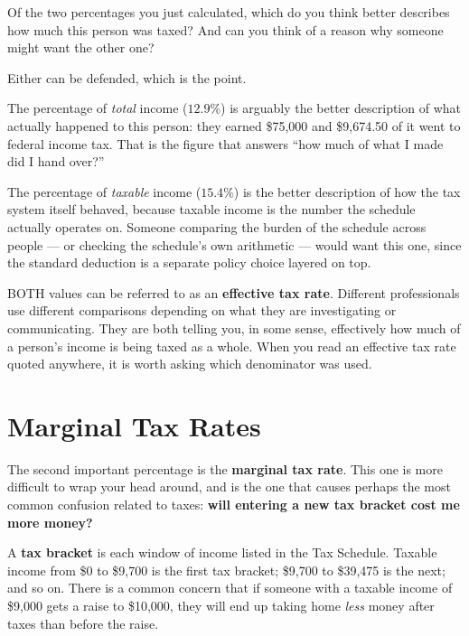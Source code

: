\documentclass[12pt]{ximera}
\begin{document}
\begin{problem}
Of the two percentages you just calculated, which do you think better describes how much
this person was taxed? And can you think of a reason why someone might want the other
one?

\begin{freeResponse}
\end{freeResponse}

\begin{solution}
Either can be defended, which is the point.

The percentage of \emph{total} income ($12.9\%$) is arguably the better description of
what actually happened to this person: they earned \$75,000 and \$9,674.50 of it went to
federal income tax. That is the figure that answers ``how much of what I made did I hand
over?''

The percentage of \emph{taxable} income ($15.4\%$) is the better description of how the
tax system itself behaved, because taxable income is the number the schedule actually
operates on. Someone comparing the burden of the schedule across people --- or checking
the schedule's own arithmetic --- would want this one, since the standard deduction is a
separate policy choice layered on top.

BOTH values can be referred to as an \textbf{effective tax rate}. Different
professionals use different comparisons depending on what they are investigating or
communicating. They are both telling you, in some sense, effectively how much of a
person's income is being taxed as a whole. When you read an effective tax rate quoted
anywhere, it is worth asking which denominator was used.
\end{solution}
\end{problem}

\section*{Marginal Tax Rates}

The second important percentage is the \textbf{marginal tax rate}. This one is more
difficult to wrap your head around, and is the one that causes perhaps the most common
confusion related to taxes: \textbf{will entering a new tax bracket cost me more money?}

A \textbf{tax bracket} is each window of income listed in the Tax Schedule. Taxable
income from \$0 to \$9,700 is the first tax bracket; \$9,700 to \$39,475 is the next;
and so on. There is a common concern that if someone with a taxable income of \$9,000
gets a raise to \$10,000, they will end up taking home \emph{less} money after taxes
than before the raise.
\end{document}
